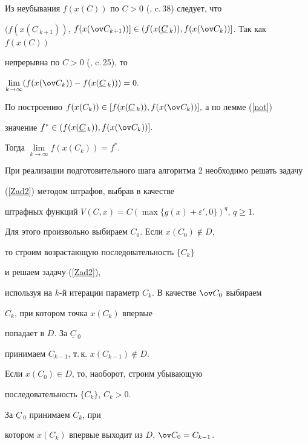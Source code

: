 \begin{pf}


Из неубывания $f(x(C))$ по $C>0$ (\cite{Fed}, c.\,38) следует, что


$(f(x(\underline C\,_{k+1}))$, $f(x(\ov C_{k+1})) ]\in




(f(x(\underline C\,_{k})), f(x(\ov C_{k})) ]$. Так как $f(x(C))$


непрерывна по $C>0$ (\cite{Dav}, c.\,25), то


$\lim\limits_{k\to\infty}( f(x(\ov C_{k})) - f(x(\underline C\,_{k})) )=0.$


По построению $f(x(C_k))\in


[ f(x(\underline C\,_{k})), f(x(\ov C_{k})) ],$ а по лемме (\ref{not})


значение $f^*\in


( f(x(\underline C\,_{k})), f(x(\ov C_{k})) ].$


Тогда $\lim\limits_{k\to\infty}f(x(C_k))=f^*.$


\end{pf}





При реализации подготовительного шага алгоритма 2 необходимо решать задачу


(\ref{Zad2}) методом штрафов, выбрав в качестве 


штрафных функций $V(C,x)=C(\max\{g(x)+\varepsilon',0\})^q$, $q\geq1$. 


Для этого произвольно выбираем $C_0$. Если $x(C_0)\notin D$,


то строим возрастающую последовательность $\{C_k\}$


и решаем задачу (\ref{Zad2}),


используя на $k$-й итерации параметр $C_k$. В качестве $\ov C_0$ выбираем


$C_k$, при котором точка $x(C_k)$ впервые


попадает в $D$. За $\underline C\,_0$ 


принимаем $C_{k-1}$, т.\,к. $x(C_{k-1})\notin D$.


Если $x(C_0)\in D$, то, наоборот, строим убывающую


последовательность $\{C_k\}$, $C_k>0$.


За $\underline C\,_0$ принимаем $C_k$, при 


котором $x(C_k)$ впервые выходит из $D$, $\ov C_0=C_{k-1}$.





